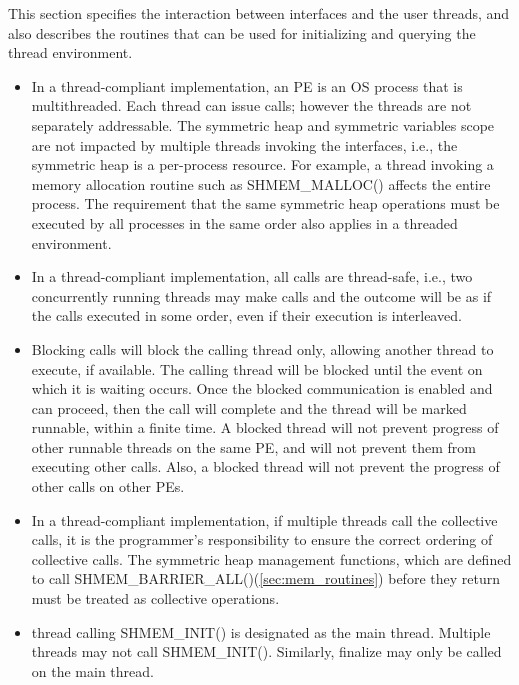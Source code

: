 This section specifies the interaction between \openshmem{} interfaces and the
user threads, and also describes the routines that can be used for initializing and 
querying the thread environment.
 

\begin{itemize}

\item
In a thread-compliant implementation, an \openshmem{} PE is an OS process that
is multithreaded. Each thread can issue \openshmem{} calls; however the threads
are not separately addressable. The symmetric heap and symmetric variables scope
are not impacted by multiple threads invoking the
\openshmem{} interfaces, i.e., the symmetric heap is a per-process resource.
For example, a thread invoking a memory allocation routine such as SHMEM\_MALLOC() 
affects the entire process. The requirement that the same symmetric heap operations must
be executed by all processes in the same order also applies in a threaded
environment. 
                                    	
\item In a thread-compliant implementation, 
all \openshmem{} calls are thread-safe, i.e., two concurrently running threads
may make \openshmem{} calls and the outcome will be as if the calls executed in
some order, even if their execution is interleaved.

\item Blocking \openshmem{} calls will block the calling thread only, allowing another
thread to execute, if available. The calling thread will be blocked until the
event on which it is waiting occurs. Once the blocked communication is enabled
and can proceed, then the call will complete and the thread will be marked
runnable, within a finite time. A blocked thread will not prevent progress of
other runnable threads on the same \ac{PE}, and will not prevent them from
executing other \openshmem{} calls. Also, a blocked thread will not prevent the
progress of other \openshmem{} calls on other \acp{PE}. 
 
\item
In a thread-compliant implementation, if multiple threads call the collective
calls, it is the programmer's responsibility to ensure the correct ordering of
collective calls.  The symmetric heap management functions, which are defined to call
SHMEM\_BARRIER\_ALL()(\ref{sec:mem_routines}) before they return 
must be treated as collective operations.

\item
\openshmem{} thread calling SHMEM\_INIT() is designated as the main thread.
Multiple threads may not call SHMEM\_INIT(). Similarly, \openshmem{} finalize
may only be called on the main thread.

\end{itemize} 
 
